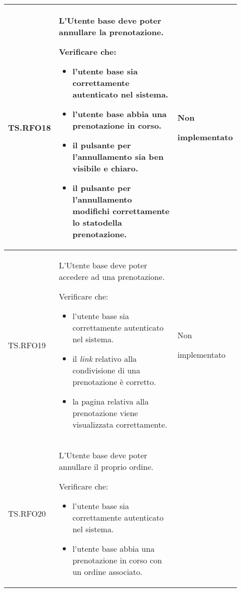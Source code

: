 \begin{longtable}{|p{0.10\linewidth}|p{0.70\linewidth}|p{0.12\linewidth}|}
	\hline
	TS.RFO18                                                                                                                        &
	L’Utente base deve poter annullare la prenotazione.  \par
	Verificare che:
	\begin{itemize}
		\item l'utente base sia correttamente autenticato nel sistema.
		\item l'utente base abbia una prenotazione in corso.
		\item il pulsante per l'annullamento sia ben visibile e chiaro.
		\item il pulsante per l'annullamento modifichi correttamente lo stato\g della prenotazione.
	\end{itemize}                                     &
	Non \par implementato                                                                                                                                                   \\
	\hline
	TS.RFO19                                                                                                                        &
	L’Utente base deve poter accedere ad una prenotazione.  \par
	Verificare che:
	\begin{itemize}
		\item l'utente base sia correttamente autenticato nel sistema.
		\item il \textit{link} relativo alla condivisione di una prenotazione è corretto.
		\item la pagina relativa alla prenotazione viene visualizzata correttamente.
	\end{itemize}                                               &
	Non \par implementato                                                                                                                                                   \\
	\hline
	TS.RFO20                                                                                                                        &
	L’Utente base deve poter annullare il proprio ordine\g.\par
	Verificare che:
	\begin{itemize}
		\item l'utente base sia correttamente autenticato nel sistema.
		\item l'utente base abbia una prenotazione in corso con un ordine associato.

\end{itemize}
\end{longtable}
